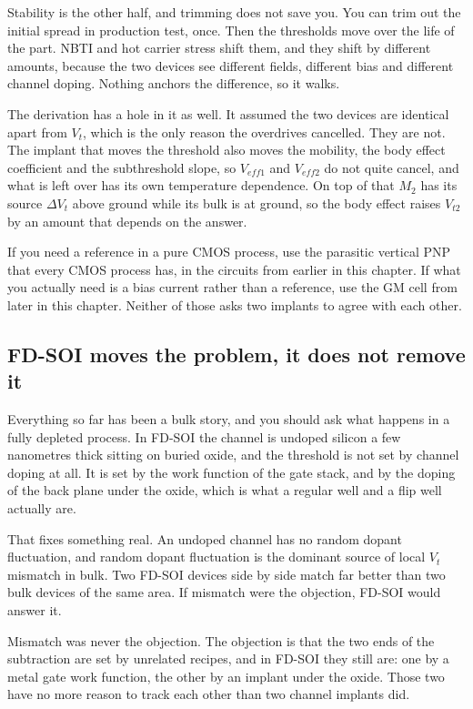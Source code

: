 Stability is the other half, and trimming does not save you. You can
trim out the initial spread in production test, once. Then the
thresholds move over the life of the part. NBTI and hot carrier stress
shift them, and they shift by different amounts, because the two devices
see different fields, different bias and different channel doping.
Nothing anchors the difference, so it walks.

The derivation has a hole in it as well. It assumed the two devices are
identical apart from \(V_t\), which is the only reason the overdrives
cancelled. They are not. The implant that moves the threshold also moves
the mobility, the body effect coefficient and the subthreshold slope, so
\(V_{eff1}\) and \(V_{eff2}\) do not quite cancel, and what is left over
has its own temperature dependence. On top of that \(M_2\) has its
source \(\Delta V_t\) above ground while its bulk is at ground, so the
body effect raises \(V_{t2}\) by an amount that depends on the answer.

If you need a reference in a pure CMOS process, use the parasitic
vertical PNP that every CMOS process has, in the circuits from earlier
in this chapter. If what you actually need is a bias current rather than
a reference, use the GM cell from later in this chapter. Neither of
those asks two implants to agree with each other.

\subsection{FD-SOI moves the problem, it does not remove
it}\label{fd-soi-moves-the-problem-it-does-not-remove-it}

Everything so far has been a bulk story, and you should ask what happens
in a fully depleted process. In FD-SOI the channel is undoped silicon a
few nanometres thick sitting on buried oxide, and the threshold is not
set by channel doping at all. It is set by the work function of the gate
stack, and by the doping of the back plane under the oxide, which is
what a regular well and a flip well actually are.

That fixes something real. An undoped channel has no random dopant
fluctuation, and random dopant fluctuation is the dominant source of
local \(V_t\) mismatch in bulk. Two FD-SOI devices side by side match
far better than two bulk devices of the same area. If mismatch were the
objection, FD-SOI would answer it.

Mismatch was never the objection. The objection is that the two ends of
the subtraction are set by unrelated recipes, and in FD-SOI they still
are: one by a metal gate work function, the other by an implant under
the oxide. Those two have no more reason to track each other than two
channel implants did.

